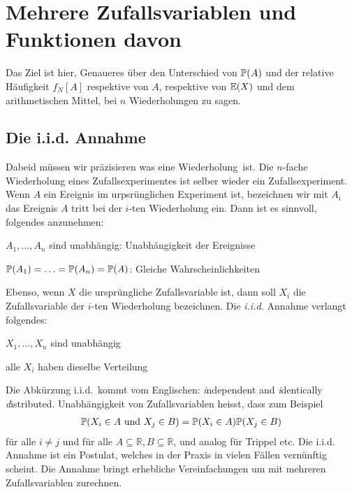 \chapter{Mehrere Zufallsvariablen und Funktionen davon}
\label{kap4}
Das Ziel ist hier, Genaueres über den Unterschied von $\mathbb P(A)$ und der relative Häufigkeit $f_N[A]$ respektive von $A$, respektive von $\operatorname{\mathbb E}(X)$ und dem arithmetischen Mittel, bei $n$ Wiederholungen zu sagen.
\section{Die i.i.d. Annahme}
Dabeid müssen wir präzisieren was eine \glqq Wiederholung\grqq\ ist. Die $n$-fache Wiederholung eines Zufallsexperimentes ist selber wieder ein Zufallsexperiment. Wenn $A$ ein Ereignis im urpsrünglichen Experiment ist, bezeichnen wir mit $A_i$ das Ereignis \glqq $A$ tritt bei der $i$-ten Wiederholung ein\grqq. Dann ist es sinnvoll, folgendes anzunehmen:
\begin{compactitem}
	\item $A_1,\ldots,A_n$ sind unabhängig: Unabhängigkeit der Ereignisse
	\item $\mathbb P(A_1)=\ldots = \mathbb P(A_n)=\mathbb P(A)$: Gleiche Wahrscheinlichkeiten\\
\end{compactitem}
Ebenso, wenn $X$ die ursprüngliche Zufallsvariable ist, dann soll $X_i$ die Zufallsvariable der $i$-ten Wiederholung bezeichnen. Die \emph{i.i.d.} Annahme verlangt folgendes:
\begin{compactitem}
	\item $X_1,\ldots,X_n$ sind unabhängig
	\item alle $X_i$ haben dieselbe Verteilung
\end{compactitem}
Die Abkürzung \glqq i.i.d.\grqq\ kommt vom Englischen: \emph{i}ndependent and \emph{i}dentically \emph{d}istributed. Unabhängigkeit von Zufallsvariablen heisst, dass zum Beispiel
\begin{gather*}
	\mathbb P(X_i\in A\text{ und }X_j\in B)= \mathbb P(X_i\in A)\mathbb P(X_j\in B)
\end{gather*}
für alle $i\neq j$ und für alle $A\subseteq \mathbb{R}, B\subseteq \mathbb{R}$, und analog für Trippel etc. Die i.i.d. Annahme ist ein \glqq Postulat\grqq, welches in der Praxis in vielen Fällen vernünftig scheint. Die Annahme bringt erhebliche Vereinfachungen um mit mehreren Zufallsvariablen zurechnen.
